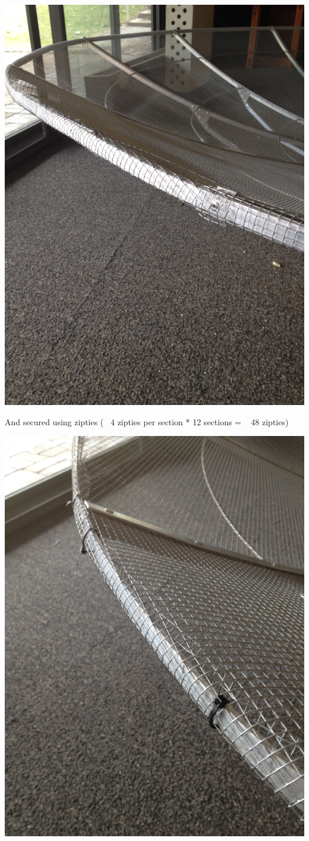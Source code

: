 \documentclass[11pt]{article} %
\begin{document}
\begin{center}
\includegraphics[scale=0.12]{dish/18.jpeg}
\end{center}


And secured using zipties (~ 4 zipties per section * 12 sections = ~ 48 zipties)


\begin{center}
\includegraphics[scale=0.12]{dish/19.jpeg}
\end{center}
\end{document}
